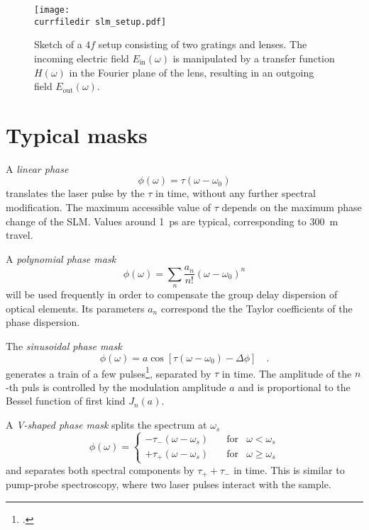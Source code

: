\begin{figure}
	\centering
	\texttt{[image: \\currfiledir slm\_setup.pdf]}
	\caption{Sketch of a $4f$ setup consisting of two gratings and lenses. The incoming electric field $E_{\text{in}}(\omega)$ is manipulated by a transfer function $H(\omega)$ in the Fourier plane of the lens, resulting in an outgoing field $E_{\text{out}}(\omega)$. }
	\label{fig:3-4f}
\end{figure}


\section{Typical masks}

A \emph{linear phase}
\begin{equation}
	\phi(\omega) = \tau (\omega-\omega_{0})
\end{equation}
translates the laser pulse by the $\tau$ in time, without any further spectral modification. The maximum accessible value of $\tau$ depends on the maximum phase change of the SLM. Values around 1~ps are typical, corresponding to 300~\textmu m travel.

A \emph{polynomial phase mask}
\begin{equation}
	\phi(\omega) = \sum_{n} \frac{a_{n}}{n!} (\omega-\omega_{0})^{n}
\end{equation}
will be used frequently in order to compensate the group delay dispersion of optical elements. Its parameters $a_n$ correspond the the Taylor coefficients of the phase dispersion.


The \emph{sinusoidal phase mask}
\begin{equation}
	\phi(\omega) = a  \cos \left[ \tau  (\omega-\omega_{0}) - \Delta\phi \right] \quad .
\end{equation}
generates a  train of a few pulses\footcite{Renard04}, separated by $\tau$ in time. The amplitude of the $n$-th puls is controlled by the modulation amplitude $a$ and is proportional to the Bessel function of first kind $J_n(a)$.

A \emph{V-shaped phase mask} splits the spectrum at $\omega_s$
\begin{equation}
	\phi(\omega) = 
\left\{
\begin{matrix}
	- \tau_{-} (\omega-\omega_s) & \quad \text{for} & \omega < \omega_s \\
	+ \tau_{+} (\omega-\omega_s) & \quad \text{for} & \omega  \ge \omega_s 
\end{matrix}
\right.	
\end{equation}
and separates both spectral components by $\tau_{+} + \tau_{-}$ in time. This is similar to pump-probe spectroscopy, where two laser pulses interact with the sample.

